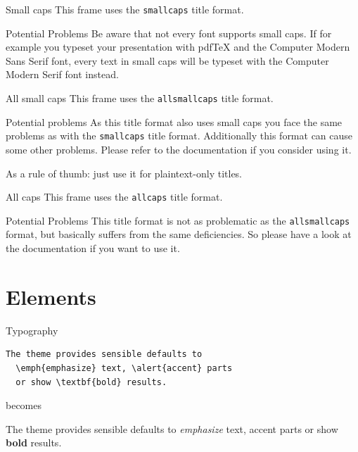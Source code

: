 \documentclass[10pt]{beamer}
\begin{document}
{
  \begin{frame}{Small caps}
    This frame uses the \texttt{smallcaps} title format.

    \begin{alertblock}{Potential Problems}
      Be aware that not every font supports small caps. If for example you typeset your presentation with pdfTeX and the Computer Modern Sans Serif font, every text in small caps will be typeset with the Computer Modern Serif font instead.
    \end{alertblock}
  \end{frame}
}

{
  \begin{frame}{All small caps}
    This frame uses the \texttt{allsmallcaps} title format.

    \begin{alertblock}{Potential problems}
      As this title format also uses small caps you face the same problems as with the \texttt{smallcaps} title format. Additionally this format can cause some other problems. Please refer to the documentation if you consider using it.

      As a rule of thumb: just use it for plaintext-only titles.
    \end{alertblock}
  \end{frame}
}

{
  \begin{frame}{All caps}
    This frame uses the \texttt{allcaps} title format.

    \begin{alertblock}{Potential Problems}
      This title format is not as problematic as the \texttt{allsmallcaps} format, but basically suffers from the same deficiencies. So please have a look at the documentation if you want to use it.
    \end{alertblock}
  \end{frame}
}

\section{Elements}

\begin{frame}[fragile]{Typography}
  \begin{verbatim}The theme provides sensible defaults to
  \emph{emphasize} text, \alert{accent} parts
  or show \textbf{bold} results.\end{verbatim}

  \begin{center}becomes\end{center}

    The theme provides sensible defaults to \emph{emphasize} text,
    \alert{accent} parts or show \textbf{bold} results.
\end{frame}
\end{document}
